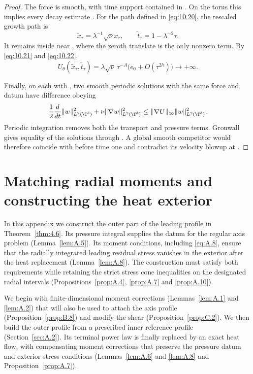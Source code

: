 \begin{proof}
%
The force is smooth, with time support contained in
. On the torus this implies every decay estimate
. For the path  defined in
\eqref{eq:10.20}, the rescaled growth path is
\[
  \widetilde x_\tau=\lambda^{-1}\sqrt\nu x_\tau,\qquad
  \widetilde t_\tau=1-\lambda^{-2}\tau.
\]
It remains inside  near , where the
zeroth translate is the only nonzero term. By \eqref{eq:10.21} and \eqref{eq:10.22},
\[
  U_\theta(\widetilde x_\tau,\widetilde t_\tau)
  =\lambda\sqrt\nu\,\tau^{-A}\bigl(e_0+O(\tau^{2h})\bigr)\longrightarrow+\infty.
\]

Finally, on each  with
, two smooth periodic solutions with the same force and datum
have difference  obeying
\[
  \frac12\frac{d}{dt}\|w\|_{L^2(\T^3)}^2
  +\nu\|\nabla w\|_{L^2(\T^3)}^2
  \leq\|\nabla U\|_\infty\|w\|_{L^2(\T^3)}^2.
\]
Periodic integration removes both the transport and pressure terms. Gronwall gives equality
of the solutions through . A global smooth competitor would
therefore coincide with  before time one and contradict its velocity
blowup at .
\end{proof}

\appendix
\section{Matching radial moments and constructing the heat exterior}\label{sec:A}
In this appendix we construct the outer part of the leading profile
 in Theorem~\ref{thm:4.6}. Its pressure integral supplies
the datum  for the regular axis problem
(Lemma~\ref{lem:A.5}). Its moment conditions, including \eqref{eq:A.8}, ensure that the
radially integrated leading residual stress  vanishes in the
exterior after the heat replacement (Lemma~\ref{lem:A.8}). The construction must satisfy
both requirements while retaining the strict stress cone inequalities on the designated
radial intervals (Propositions~\ref{prop:A.4}, \ref{prop:A.7} and \ref{prop:A.10}).

We begin with finite-dimensional moment corrections (Lemmas~\ref{lem:A.1} and
\ref{lem:A.2}) that will also be used to attach the axis profile
(Proposition~\ref{prop:B.8}) and modify the shear (Proposition~\ref{prop:C.2}). We then
build the outer profile from a prescribed inner reference profile (Section~\ref{sec:A.2}).
Its terminal power law  is finally replaced by an
exact heat flow, with compensating moment corrections that preserve the pressure datum and
exterior stress conditions (Lemmas~\ref{lem:A.6} and \ref{lem:A.8} and
Proposition~\ref{prop:A.7}).

